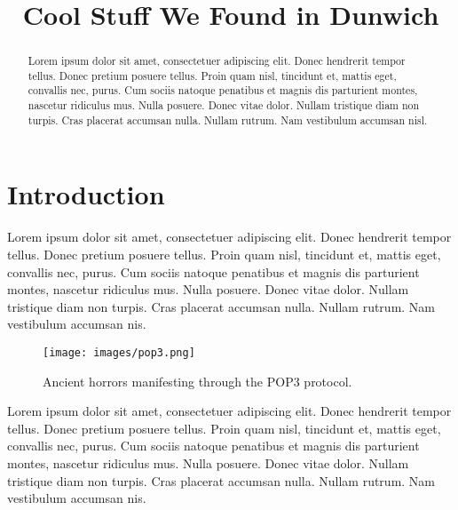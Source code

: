 \documentclass[conference]{IEEEtran}
\begin{document}
\title{Cool Stuff We Found in Dunwich}

\author{
\and
{}
}

\maketitle

\begin{abstract}
Lorem ipsum dolor sit amet, consectetuer adipiscing \cite{foo-bar-86} elit. Donec hendrerit tempor tellus. Donec pretium posuere tellus. Proin quam nisl, tincidunt et, mattis eget, convallis nec, purus. Cum sociis natoque penatibus et magnis dis parturient montes, nascetur ridiculus mus. Nulla posuere. Donec vitae dolor. Nullam tristique diam non turpis. Cras placerat accumsan nulla. Nullam rutrum. Nam vestibulum accumsan nisl.
\end{abstract}

\section{Introduction}

Lorem ipsum dolor sit amet, consectetuer adipiscing elit. Donec hendrerit tempor tellus. Donec pretium posuere tellus. Proin quam nisl, tincidunt et, mattis eget, convallis nec, purus. Cum sociis natoque penatibus et magnis dis parturient montes, nascetur ridiculus mus. Nulla posuere. Donec vitae dolor. Nullam tristique diam non turpis. Cras placerat accumsan nulla. Nullam rutrum. Nam vestibulum accumsan nis.

\begin{figure}[h]
  \centering
  \texttt{[image: images/pop3.png]}
  \caption{Ancient horrors manifesting through the POP3 protocol.}
  \label{fig:how_pop3_works}
\end{figure}

Lorem ipsum dolor sit amet, consectetuer adipiscing elit. Donec hendrerit tempor tellus. Donec pretium posuere tellus. Proin quam nisl, tincidunt et, mattis eget, convallis nec, purus. Cum sociis natoque penatibus et magnis dis parturient montes, nascetur ridiculus mus. Nulla posuere. Donec vitae dolor. Nullam tristique diam non turpis. Cras placerat accumsan nulla. Nullam rutrum. Nam vestibulum accumsan nis.
\end{document}
